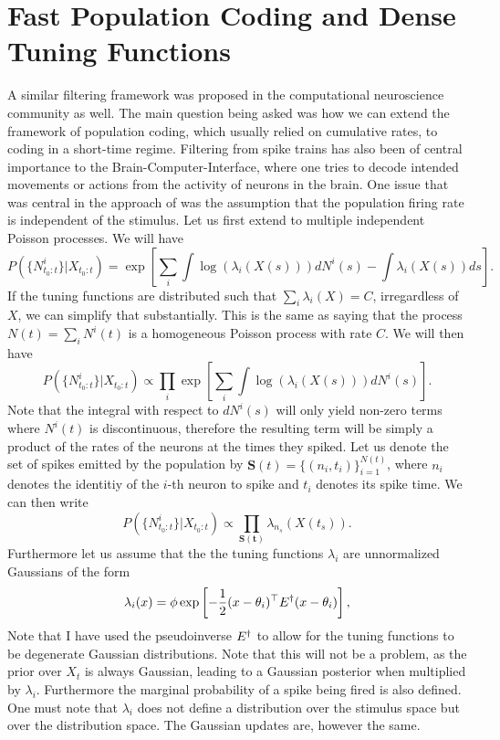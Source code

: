 \section{Fast Population Coding and Dense Tuning Functions}
\label{sec:fast_coding}
A similar filtering framework was proposed in the computational neuroscience community as well.\cite{Huys2007} The main question being asked was how we can extend the framework of population coding, which usually relied on cumulative rates, to coding in a short-time regime. Filtering from spike trains has also been of central importance to the Brain-Computer-Interface, where one tries to decode intended movements or actions from the activity of neurons in the brain.\cite{Ergun2007} One issue that was central in the approach of \citet{Huys2007} was the assumption that the population firing rate is independent of the stimulus. Let us first extend  to multiple independent Poisson processes. We will have
\begin{equation}
\label{eq:dspp_multi_likelihood}
P(\{N^i_{t_0:t}\}|X_{t_0:t}) = \exp\left[\sum_i \int \log(\lambda_i(X(s)))dN^i(s) -\int \lambda_i(X(s))ds\right].
\end{equation}
If the tuning functions are distributed such that $\sum_i\lambda_i(X) = C$, irregardless of $X$, we can simplify that substantially. This is the same as saying that the process $N(t) = \sum_i N^i(t)$ is a homogeneous Poisson process with rate $C$.
We will then have
\begin{equation}
P(\{N^i_{t_0:t}\}|X_{t_0:t}) \propto \prod_i \exp\left[\sum_i \int \log(\lambda_i(X(s))) dN^i(s)\right].
\end{equation}
Note that the integral with respect to $dN^i(s)$ will only yield non-zero terms where $N^i(t)$ is discontinuous, therefore the resulting term will be simply a product of the rates of the neurons at the times they spiked. Let us denote the set of spikes emitted by the population by $\boldsymbol{S}(t) = \{(n_i,t_i)\}_{i=1}^{N(t)}$, where $n_i$ denotes the identitiy of the $i$-th neuron to spike and $t_i$ denotes its spike time. We can then write
\begin{equation}
P(\{N^i_{t_0:t}\}|X_{t_0:t}) \propto \prod_{\boldsymbol{S(t)}} \lambda_{n_s}(X(t_s)).
\end{equation}
Furthermore let us assume that the the tuning functions $\lambda_i$ are unnormalized Gaussians of the form
\[
\lambda_i(x) = \phi \exp\left[-\frac{1}{2} (x-\theta_i)^\top E^\dagger (x-\theta_i)\right],
\]
Note that I have used the pseudoinverse $E^\dagger$ to allow for the tuning functions to be degenerate Gaussian distributions. Note that this will not be a problem, as the prior over $X_t$ is always Gaussian, leading to a Gaussian posterior when multiplied by $\lambda_i$. Furthermore the marginal probability of a spike being fired is also defined. One must note that $\lambda_i$ does not define a distribution over the stimulus space but over the distribution space. The Gaussian updates are, however the same.\par
